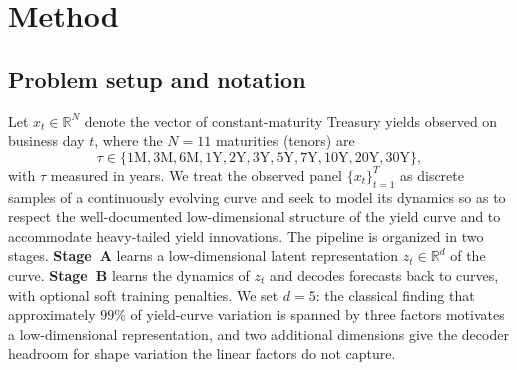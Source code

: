 \documentclass{article} %
\begin{document}
\section{Method}
\label{sec:method}
\subsection{Problem setup and notation}
Let $x_t \in \mathbb{R}^{N}$ denote the vector of constant-maturity Treasury
yields observed on business day $t$, where the $N=11$ maturities (tenors) are
\begin{equation*}
\tau \in \{1\mathrm{M}, 3\mathrm{M}, 6\mathrm{M}, 1\mathrm{Y}, 2\mathrm{Y},
3\mathrm{Y}, 5\mathrm{Y}, 7\mathrm{Y}, 10\mathrm{Y}, 20\mathrm{Y},
30\mathrm{Y}\},
\end{equation*}
with $\tau$ measured in years. We treat the observed panel
$\{x_t\}_{t=1}^{T}$ as discrete samples of a continuously evolving curve and seek
to model its dynamics so as to respect the well-documented low-dimensional
structure of the yield curve and to accommodate heavy-tailed yield innovations.
The pipeline is organized in two stages. \textbf{Stage~A} learns a low-dimensional
latent representation $z_t \in \mathbb{R}^{d}$ of the curve. \textbf{Stage~B} learns
the dynamics of $z_t$ and decodes forecasts back to curves, with optional soft
training penalties. We set $d=5$: the classical finding that approximately $99\%$ of
yield-curve variation is spanned by three factors motivates a low-dimensional
representation, and two additional dimensions give the decoder headroom for shape
variation the linear factors do not capture.
\end{document}
